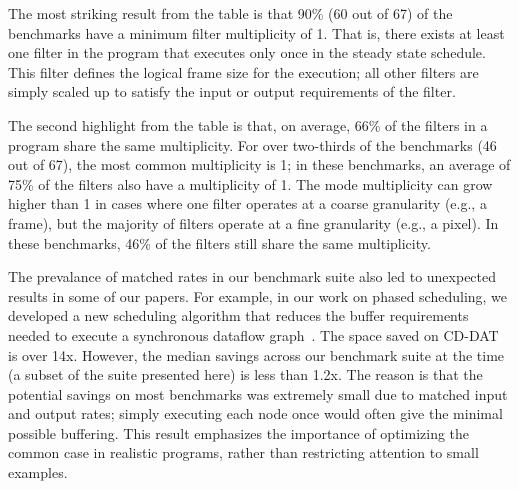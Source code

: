 
  The most striking result from the table is that 90\% (60 out of 67)
  of the benchmarks have a minimum filter multiplicity of 1.  That is,
  there exists at least one filter in the program that executes only
  once in the steady state schedule.  This filter defines the logical
  frame size for the execution; all other filters are simply scaled up
  to satisfy the input or output requirements of the filter.  


  The second highlight from the table is that, on average, 66\% of the
  filters in a program share the same multiplicity.  For over
  two-thirds of the benchmarks (46 out of 67), the most common
  multiplicity is 1; in these benchmarks, an average of 75\% of the
  filters also have a multiplicity of 1.  The mode multiplicity can
  grow higher than 1 in cases where one filter operates at a coarse
  granularity (e.g., a frame), but the majority of filters operate at
  a fine granularity (e.g., a pixel).  In these benchmarks, 46\% of
  the filters still share the same multiplicity.

  The prevalance of matched rates in our benchmark suite also led to
  unexpected results in some of our papers.  For example, in our work
  on phased scheduling, we developed a new scheduling algorithm that
  reduces the buffer requirements needed to execute a synchronous
  dataflow graph~\cite{karczmarek-lctes03}.  The space saved on CD-DAT
  is over 14x.  However, the median savings across our benchmark suite
  at the time (a subset of the suite presented here) is less than
  1.2x.  The reason is that the potential savings on most benchmarks
  was extremely small due to matched input and output rates; simply
  executing each node once would often give the minimal possible
  buffering.  This result emphasizes the importance of optimizing the
  common case in realistic programs, rather than restricting attention
  to small examples.

